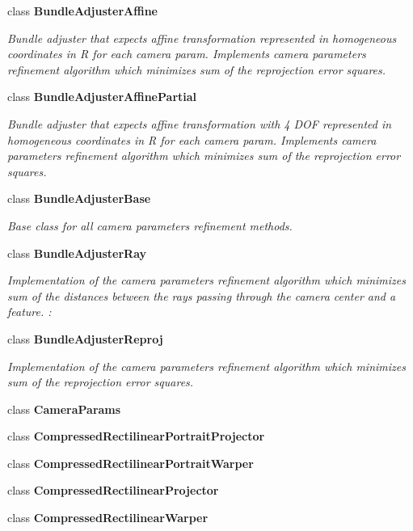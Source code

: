\begin{DoxyCompactItemize}
class {\bfseries Bundle\+Adjuster\+Affine}
\begin{DoxyCompactList}\small\item\em Bundle adjuster that expects affine transformation represented in homogeneous coordinates in R for each camera param. Implements camera parameters refinement algorithm which minimizes sum of the reprojection error squares. \end{DoxyCompactList}\item 
class {\bfseries Bundle\+Adjuster\+Affine\+Partial}
\begin{DoxyCompactList}\small\item\em Bundle adjuster that expects affine transformation with 4 D\+OF represented in homogeneous coordinates in R for each camera param. Implements camera parameters refinement algorithm which minimizes sum of the reprojection error squares. \end{DoxyCompactList}\item 
class {\bfseries Bundle\+Adjuster\+Base}
\begin{DoxyCompactList}\small\item\em Base class for all camera parameters refinement methods. \end{DoxyCompactList}\item 
class {\bfseries Bundle\+Adjuster\+Ray}
\begin{DoxyCompactList}\small\item\em Implementation of the camera parameters refinement algorithm which minimizes sum of the distances between the rays passing through the camera center and a feature. \+: \end{DoxyCompactList}\item 
class {\bfseries Bundle\+Adjuster\+Reproj}
\begin{DoxyCompactList}\small\item\em Implementation of the camera parameters refinement algorithm which minimizes sum of the reprojection error squares. \end{DoxyCompactList}\item 
class {\bfseries Camera\+Params}
\item 
class {\bfseries Compressed\+Rectilinear\+Portrait\+Projector}
\item 
class {\bfseries Compressed\+Rectilinear\+Portrait\+Warper}
\item 
class {\bfseries Compressed\+Rectilinear\+Projector}
\item 
class {\bfseries Compressed\+Rectilinear\+Warper}
\item 

\end{DoxyCompactItemize}
